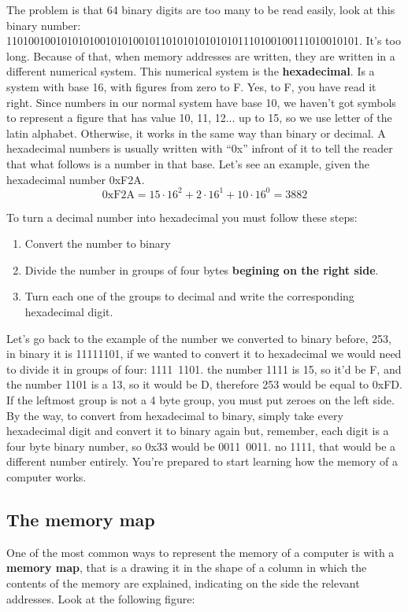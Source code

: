 \documentclass[a4paper]{article}
\begin{document}
The problem is that 64 binary digits are too many to be read easily, look at
this binary number:
1101001001010101001010100101101010101010101110100100111010010101. It's too long.
Because of that, when memory addresses are written, they are written in a
different numerical system. This numerical system is the \textbf{hexadecimal}.
Is a system with base 16, with figures from zero to F. Yes, to F, you have read it
right. Since numbers in our normal system have base 10, we haven't got symbols
to represent a figure that has value 10, 11, 12... up to 15, so we use letter of
the latin alphabet. Otherwise, it works in the same way than binary or
decimal. A hexadecimal numbers is usually written with ``0x'' infront of it
to tell the reader that what follows is a number in that base. Let's see an
example, given the hexadecimal number 0xF2A.
$$
\mathrm{0xF2A} = 15\cdot16^2 + 2\cdot16^1 + 10\cdot16^0 = 3882
$$

To turn a decimal number into hexadecimal you must follow these steps:
\begin{enumerate}
\item Convert the number to binary
\item Divide the number in groups of four bytes \textbf{begining on the right
side}.
\item Turn each one of the groups to decimal and write the corresponding
hexadecimal digit.
\end{enumerate}

Let's go back to the example of the number we converted to binary before, 253,
in binary it is 11111101, if we wanted to convert it to hexadecimal we would
need to divide it in groups of four: 1111~1101. the number 1111 is 15, so it'd
be F, and the number 1101 is a 13, so it would be D, therefore 253 would be
equal to 0xFD. If the leftmost group is not a 4 byte group, you must put zeroes
on the left side. By the way, to convert from hexadecimal to binary, simply take
every hexadecimal digit and convert it to binary again but, remember, each
digit is a four byte binary number, so 0x33 would be 0011~0011. no 1111, that
would be a different number entirely. You're prepared to start learning how the
memory of a computer works.

\subsection{The memory map}
One of the most common ways to represent the memory of a computer is with a
\textbf{memory map}, that is a drawing it in the shape of a column in which the
contents of the memory are explained, indicating on the side the relevant
addresses. Look at the following figure:
\end{document}

